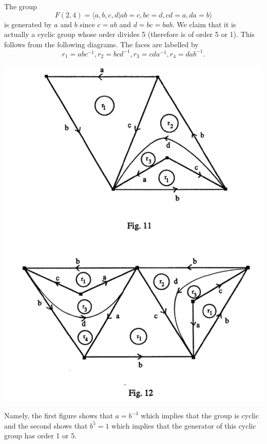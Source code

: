 \begin{eg} The group \[F(2,4) = \langle a,b,c,d | ab = c, bc = d, cd = a, da =
    b\rangle\] is generated by $a$ and $b$ since $c = ab$ and $d = bc = bab$.
    We claim that it is actually a cyclic group whose order divides 5
    (therefore is of order 5 or 1). This follows from the following diagrams.
    The faces are labelled by \[r_1 = abc^{-1}, r_2 = bcd^{-1}, r_3 = cda^{-1},
    r_4 = dab^{-1}.\]
\begin{center}
    \includegraphics[scale=0.4]{resources/f24.pdf}
\end{center}
    Namely, the first figure shows that $a = b^{-3}$ which implies that the
    group is cyclic and the second shows that $b^5 = 1$ which implies that the
    generator of this cyclic group has order 1 or 5.
\end{eg}

